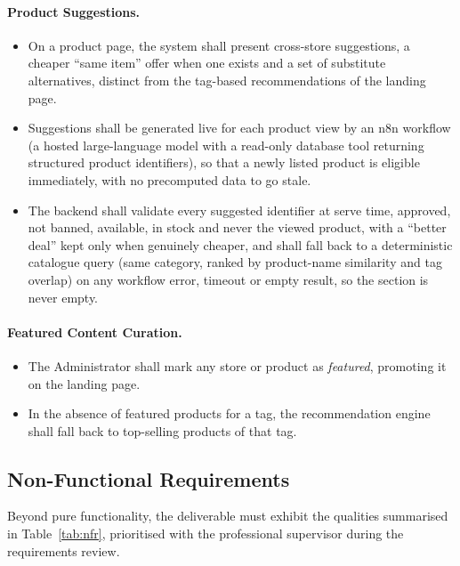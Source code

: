 \paragraph{Product Suggestions.}
\begin{itemize}[leftmargin=*,itemsep=1pt]
  \item On a product page, the system shall present cross-store
        suggestions, a cheaper ``same item'' offer when one exists and
        a set of substitute alternatives, distinct from the tag-based
        recommendations of the landing page.
  \item Suggestions shall be generated live for each product view by an
        n8n workflow (a hosted large-language model with a read-only
        database tool returning structured product identifiers), so that a
        newly listed product is eligible immediately, with no precomputed
        data to go stale.
  \item The backend shall validate every suggested identifier at serve
        time, approved, not banned, available, in stock and never the
        viewed product, with a ``better deal'' kept only when genuinely
        cheaper, and shall fall back to a deterministic catalogue query
        (same category, ranked by product-name similarity and tag overlap)
        on any workflow error, timeout or empty result, so the section is
        never empty.
\end{itemize}

\paragraph{Featured Content Curation.}
\begin{itemize}[leftmargin=*,itemsep=1pt]
  \item The Administrator shall mark any store or product as
        \textit{featured}, promoting it on the landing page.
  \item In the absence of featured products for a tag, the
        recommendation engine shall fall back to top-selling products of
        that tag.
\end{itemize}

\subsection{Non-Functional Requirements}

Beyond pure functionality, the deliverable must exhibit the qualities
summarised in Table~\ref{tab:nfr}, prioritised with the professional
supervisor during the requirements review.

